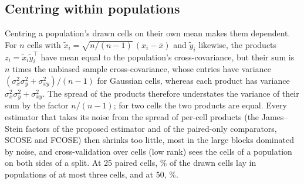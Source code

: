 \begin{table}[h]
\caption{\textbf{Bone-marrow test: recovered fraction of within-cell-type dependence by source of unpaired cells.} Pooled over the twelve held-out batches; recovered fraction (\%) at each budget of paired cells, averaged over five draws, and paired cells needed to reach the primary target (\DpTarget\%, half of the best recovery), interpolated on the running maximum of each curve. Paired cells only, the best at each budget of James--Stein shrinkage, SCOSE, FCOSE and cross-validated low rank, pooled or per cell type. Same samples, their averages: paired cells centred on the population averages of unpaired cells of the same batches; other sites, their averages: centred on the other sites' cell-type averages; RNA from nuclei: unpaired RNA from multiome nuclei of the other sites; all other rows: paired cells centred and scaled on their own statistics, as prespecified.}
\label{tab:deploy}
\centering\footnotesize

\end{table}

\begin{table}[h]
\caption{\textbf{Bone-marrow test by site.} Savings over paired-only estimation at half of each site's best recovery, pooled over the site's three held-out batches. $\geq$, paired-only estimation did not reach the target within 800 paired cells, so the saving is a lower bound; n.r., neither curve reached it.}
\label{tab:deploysite}
\centering\footnotesize

\end{table}

\subsection*{Centring within populations}
Centring a population's drawn cells on their own mean makes them dependent. For $n$ cells with $\tilde x_i=\sqrt{n/(n-1)}\,(x_i-\bar x)$ and $\tilde y_i$ likewise, the products $z_i=\tilde x_i\tilde y_i^\top$ have mean equal to the population's cross-covariance, but their sum is $n$ times the unbiased sample cross-covariance, whose entries have variance $(\sigma_{x}^2\sigma_{y}^2+\sigma_{xy}^2)/(n-1)$ for Gaussian cells, whereas each product has variance $\sigma_{x}^2\sigma_{y}^2+\sigma_{xy}^2$. The spread of the products therefore understates the variance of their sum by the factor $n/(n-1)$; for two cells the two products are equal. Every estimator that takes its noise from the spread of per-cell products (the James--Stein factors of the proposed estimator and of the paired-only comparators, SCOSE and FCOSE) then shrinks too little, most in the large blocks dominated by noise, and cross-validation over cells (low rank) sees the cells of a population on both sides of a split. At 25 paired cells, \PsSmallTwentyFive\% of the drawn cells lay in populations of at most three cells, and at 50, \PsSmallFifty\%.

